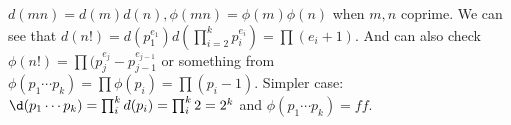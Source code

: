 \documentclass{article}
\begin{document}
	$d(mn) = d(m)d(n), \phi(mn)=\phi(m)\phi(n)$ when $m,n$ coprime.
	We can see that $d(n!) = d(p_1^{e_1})d(\prod_{i=2}^kp_i^{e_i})
	= \prod (e_i + 1)$.
	And can also check $\phi(n!) = \prod (p_j^{e_j} - p_{j-1}^{e_{j-1}}$
	or something from $\phi(p_1\cdots p_k) = \prod\phi(p_i) = \prod(p_i-1)$.
	Simpler case: $\d(p_1\cdots p_k) = \prod_i^k d(p_i) = \prod_i^k 2 = 2^k$
	and $\phi(p_1\cdots p_k) = ff$.
\end{document}
